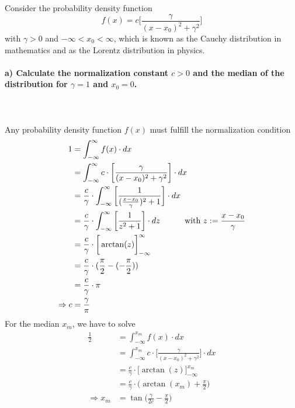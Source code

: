 Consider the probability density function
\begin{equation}
    f(x)=c\bigg[\frac{\gamma}{(x-x_0)^2+\gamma^2}\bigg]
\end{equation}
with $\gamma>0$ and $-\infty<x_0<\infty$, which is known as the 
Cauchy distribution in mathematics and as the Lorentz distribution
in physics.

\paragraph{a) Calculate the normalization constant $c>0$ and the median
    of the distribution for $\gamma=1$ and $x_0=0$.
} \ \\
\\
    Any probability density function $f(x)$ must fulfill the normalization 
    condition
    \begin{align}
        1
        &=\int_{-\infty}^\infty f(x)\cdot dx \\
        &=\int_{-\infty}^\infty c\cdot\bigg[
            \frac{\gamma}{(x-x_0)^2+\gamma^2}
        \bigg]\cdot dx \\
        &=\frac{c}{\gamma}\cdot\int_{-\infty}^\infty \bigg[
            \frac{1}{(\frac{x-x_0}{\gamma})^2+1}
        \bigg]\cdot dx \\
        &=\frac{c}{\gamma}\cdot\int_{-\infty}^\infty \bigg[
            \frac{1}{z^2+1}
        \bigg]\cdot dz\ \ \ \ \ \ \ \ \ 
        \textnormal{with } z:=\frac{x-x_0}{\gamma} \\
        &=\frac{c}{\gamma}\cdot\bigg[\arctan(z)\bigg]^{\infty}_{-\infty} \\
        &=\frac{c}{\gamma}\cdot(\frac{\pi}{2}-(-\frac{\pi}{2})) \\
        &=\frac{c}{\gamma}\cdot\pi \\
        \Rightarrow c&=\frac{\gamma}{\pi}
    \end{align}
    For the median $x_m$, we have to solve
    \begin{align}
        \frac{1}{2}
        &=\int_{-\infty}^{x_m}f(x)\cdot dx \\
        &=\int_{-\infty}^{x_m}c\cdot\bigg[
            \frac{\gamma}{(x-x_0)^2+\gamma^2}
        \bigg]\cdot dx \\
        &=\frac{c}{\gamma}\cdot\bigg[\arctan(z)\bigg]^{x_m}_{-\infty} \\
        &=\frac{c}{\gamma}\cdot\bigg(\arctan(x_m)+\frac{\pi}{2}\bigg) \\
        \Rightarrow x_m
        &=\tan\bigg({\frac{\gamma}{2c}-\frac{\pi}{2}}\bigg)
    \end{align}

